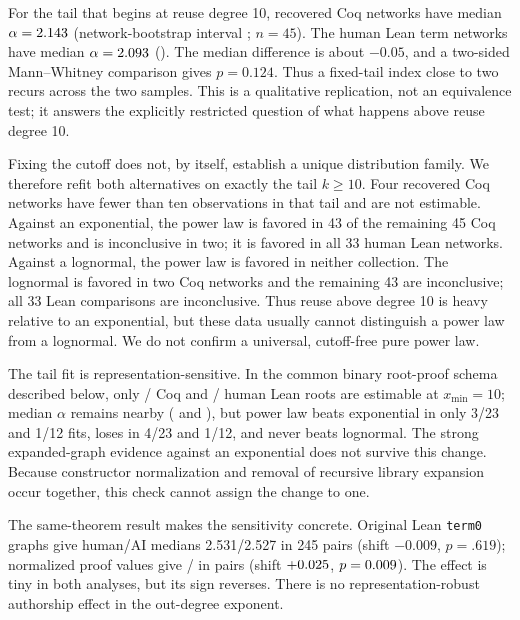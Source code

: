 \documentclass[11pt]{article}
\newcommand{\code}[1]{\texttt{#1}}
\begin{document}
For the tail that begins at reuse degree 10, recovered Coq networks have median
$\alpha=2.143$ (network-bootstrap interval \CoqAlphaCI{}; $n=45$).  The \HumanLeanN{} human Lean
term networks have median $\alpha=2.093$ (\LeanAlphaCI{}).  The median difference is about
$-0.05$, and a two-sided Mann--Whitney comparison gives $p=0.124$.  Thus a fixed-tail index close to
two recurs across the two samples.  This is a qualitative replication, not an equivalence test; it
answers the explicitly restricted question of what happens above reuse degree 10.

Fixing the cutoff does not, by itself, establish a unique distribution family.  We therefore refit
both alternatives on exactly the tail $k\geq10$.  Four recovered Coq networks have fewer than ten
observations in that tail and are not estimable.  Against an exponential, the power law is favored
in 43 of the remaining 45 Coq networks and is inconclusive in two; it is favored in all 33 human
Lean networks.  Against a lognormal, the power law is favored in neither collection.  The lognormal
is favored in two Coq networks and the remaining 43 are inconclusive; all 33 Lean comparisons are
inconclusive.  Thus reuse above degree 10 is heavy relative to an exponential, but these data
usually cannot distinguish a power law from a lognormal.  We do not confirm a universal,
cutoff-free pure power law.

The tail fit is representation-sensitive.  In the common binary root-proof schema described below,
only \NormOutCoqFits{}/\NormOutCoqN{} Coq and \NormOutLeanFits{}/\NormOutLeanN{} human Lean roots
are estimable at $x_{\min}=10$; median $\alpha$ remains nearby
(\NormOutCoqAlpha{} and \NormOutLeanAlpha{}), but power law beats exponential in only 3/23 and
1/12 fits, loses in 4/23 and 1/12, and never beats lognormal.  The strong expanded-graph evidence
against an exponential does not survive this change.  Because constructor normalization and
removal of recursive library expansion occur together, this check cannot assign the change to one.

The same-theorem result makes the sensitivity concrete.  Original Lean \code{term0} graphs give
human/AI medians 2.531/2.527 in 245 pairs (shift $-0.009$, $p=.619$); normalized proof values give
\NormOutHumanAlpha{}/\NormOutAIAlpha{} in \NormOutPairN{} pairs (shift $+0.025$,
$p=0.009$).  The effect is tiny in both analyses, but its sign reverses.  There is no
representation-robust authorship effect in the out-degree exponent.
\end{document}
